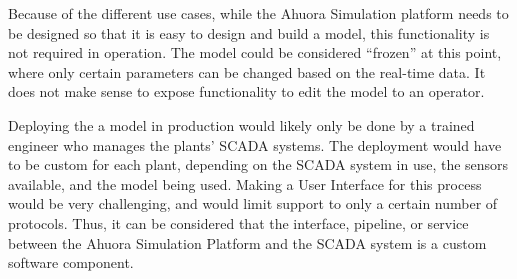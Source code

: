 Because of the different use cases, while the Ahuora Simulation platform needs to be designed so that it is easy to design and build a model, this functionality is not required in operation. The model could be considered ``frozen'' at this point, where only certain parameters can be changed based on the real-time data. It does not make sense to expose functionality to edit the model to an operator. 



Deploying the a model in production would likely only be done by a trained engineer who manages the plants' SCADA systems.
The deployment would have to be custom for each plant, depending on the SCADA system in use, the sensors available, and the model being used. 
Making a User Interface for this process would be very challenging, and would limit support to only a certain number of protocols. 
Thus, it can be considered that the interface, pipeline, or service between the Ahuora Simulation Platform and the SCADA system is a custom software component. 












